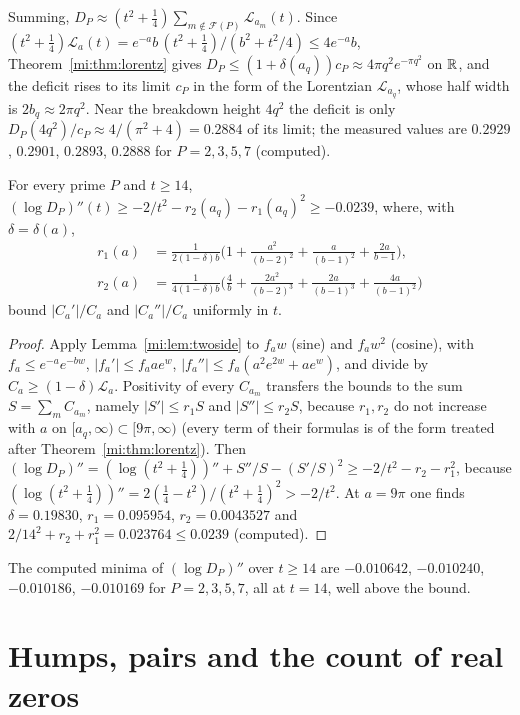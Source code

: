 Summing, $D_P\approx(t^2+\tfrac14)\sum_{m\notin\mathcal F(P)}\mathcal L_{a_m}(t)$. Since $(t^2+\tfrac14)\mathcal L_a(t)=e^{-a}b\,(t^2+\tfrac14)/(b^2+t^2/4)\le4e^{-a}b$, Theorem~\ref{mi:thm:lorentz} gives $D_P\le(1+\delta(a_q))c_P\approx4\pi q^2e^{-\pi q^2}$ on $\mathbb{R}$, and the deficit rises to its limit $c_P$ in the form of the Lorentzian $\mathcal L_{a_q}$, whose half width is $2b_q\approx2\pi q^2$. Near the breakdown height $4q^2$ the deficit is only $D_P(4q^2)/c_P\approx4/(\pi^2+4)=0.2884$ of its limit; the measured values are $0.2929$, $0.2901$, $0.2893$, $0.2888$ for $P=2,3,5,7$ (computed).

\begin{theorem}[Curvature]\label{mi:thm:curv}
For every prime $P$ and $t\ge14$, $(\log D_P)''(t)\ge-2/t^2-r_2(a_q)-r_1(a_q)^2\ge-0.0239$, where, with $\delta=\delta(a)$,
\begin{align*}
r_1(a)&=\frac{1}{2(1-\delta)b}\Big(1+\frac{a^2}{(b-2)^2}+\frac a{(b-1)^2}+\frac{2a}{b-1}\Big),\\
r_2(a)&=\frac{1}{4(1-\delta)b}\Big(\frac4b+\frac{2a^2}{(b-2)^3}+\frac{2a}{(b-1)^3}+\frac{4a}{(b-1)^2}\Big)
\end{align*}
bound $|C_a'|/C_a$ and $|C_a''|/C_a$ uniformly in $t$.
\end{theorem}

\begin{proof}
Apply Lemma~\ref{mi:lem:twoside} to $f_aw$ (sine) and $f_aw^2$ (cosine), with $f_a\le e^{-a}e^{-bw}$, $|f_a'|\le f_aae^w$, $|f_a''|\le f_a(a^2e^{2w}+ae^w)$, and divide by $C_a\ge(1-\delta)\mathcal L_a$. Positivity of every $C_{a_m}$ transfers the bounds to the sum $S=\sum_mC_{a_m}$, namely $|S'|\le r_1S$ and $|S''|\le r_2S$, because $r_1,r_2$ do not increase with $a$ on $[a_q,\infty)\subset[9\pi,\infty)$ (every term of their formulas is of the form treated after Theorem~\ref{mi:thm:lorentz}). Then $(\log D_P)''=(\log(t^2+\tfrac14))''+S''/S-(S'/S)^2\ge-2/t^2-r_2-r_1^2$, because $(\log(t^2+\tfrac14))''=2(\tfrac14-t^2)/(t^2+\tfrac14)^2>-2/t^2$. At $a=9\pi$ one finds $\delta=0.19830$, $r_1=0.095954$, $r_2=0.0043527$ and $2/14^2+r_2+r_1^2=0.023764\le0.0239$ (computed).
\end{proof}

The computed minima of $(\log D_P)''$ over $t\ge14$ are $-0.010642$, $-0.010240$, $-0.010186$, $-0.010169$ for $P=2,3,5,7$, all at $t=14$, well above the bound.

\section{Humps, pairs and the count of real zeros}\label{mi:sec:humps}

